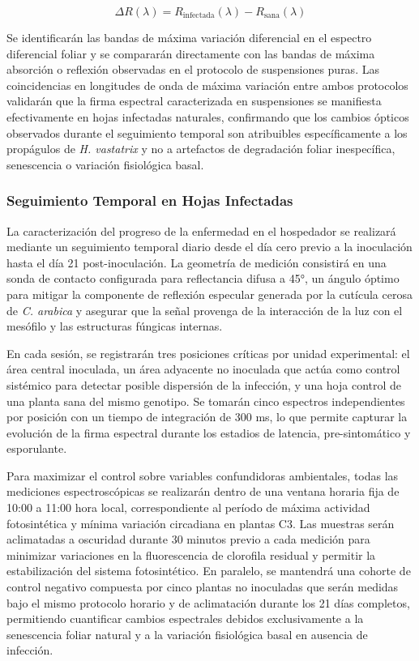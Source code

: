 \documentclass[12pt, a4paper]{article}
\begin{document}
	\begin{equation}
		\Delta R(\lambda) = R_{\text{infectada}}(\lambda) - R_{\text{sana}}(\lambda)
	\end{equation}
	
	Se identificarán las bandas de máxima variación diferencial en el espectro diferencial foliar y se compararán directamente con las bandas de máxima absorción o reflexión observadas en el protocolo de suspensiones puras. Las coincidencias en longitudes de onda de máxima variación entre ambos protocolos validarán que la firma espectral caracterizada en suspensiones se manifiesta efectivamente en hojas infectadas naturales, confirmando que los cambios ópticos observados durante el seguimiento temporal son atribuibles específicamente a los propágulos de \textit{H. vastatrix} y no a artefactos de degradación foliar inespecífica, senescencia o variación fisiológica basal.
	
	\subsubsection{Seguimiento Temporal en Hojas Infectadas}
	
	La caracterización del progreso de la enfermedad en el hospedador se realizará mediante un seguimiento temporal diario desde el día cero previo a la inoculación hasta el día 21 post-inoculación. La geometría de medición consistirá en una sonda de contacto configurada para reflectancia difusa a 45°, un ángulo óptimo para mitigar la componente de reflexión especular generada por la cutícula cerosa de \textit{C. arabica} y asegurar que la señal provenga de la interacción de la luz con el mesófilo y las estructuras fúngicas internas.
	
	En cada sesión, se registrarán tres posiciones críticas por unidad experimental: el área central inoculada, un área adyacente no inoculada que actúa como control sistémico para detectar posible dispersión de la infección, y una hoja control de una planta sana del mismo genotipo. Se tomarán cinco espectros independientes por posición con un tiempo de integración de 300 ms, lo que permite capturar la evolución de la firma espectral durante los estadios de latencia, pre-sintomático y esporulante.
	
	Para maximizar el control sobre variables confundidoras ambientales, todas las mediciones espectroscópicas se realizarán dentro de una ventana horaria fija de 10:00 a 11:00 hora local, correspondiente al período de máxima actividad fotosintética y mínima variación circadiana en plantas C3. Las muestras serán aclimatadas a oscuridad durante 30 minutos previo a cada medición para minimizar variaciones en la fluorescencia de clorofila residual y permitir la estabilización del sistema fotosintético. En paralelo, se mantendrá una cohorte de control negativo compuesta por cinco plantas no inoculadas que serán medidas bajo el mismo protocolo horario y de aclimatación durante los 21 días completos, permitiendo cuantificar cambios espectrales debidos exclusivamente a la senescencia foliar natural y a la variación fisiológica basal en ausencia de infección.
	
\end{document}
